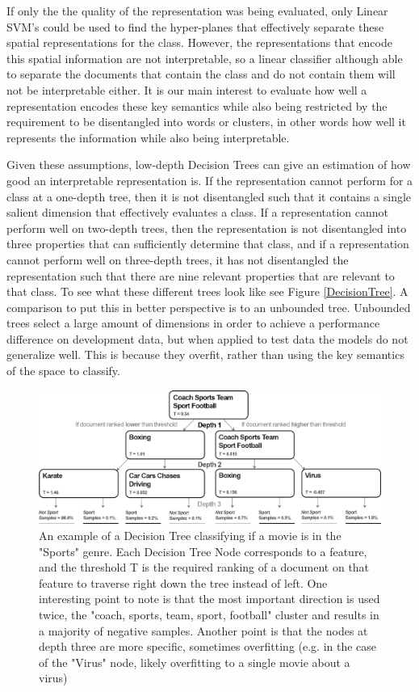 If only the the quality of the representation was being evaluated, only Linear SVM's could be used to find the hyper-planes that effectively separate these spatial representations for the class. However, the representations that encode this spatial information are not interpretable, so a linear classifier although able to separate the documents that contain the class and do not contain them will not be interpretable either. It is our main interest to evaluate how well a representation encodes these key semantics while also being restricted by the requirement to be disentangled into words or clusters, in other words how well it represents the information while also being interpretable.

Given these assumptions, low-depth Decision Trees can give an estimation of how good an interpretable representation is. If the representation cannot perform for a class at a one-depth tree, then it is not disentangled such that it contains a single salient dimension that effectively evaluates a class. If a representation cannot perform well on two-depth trees, then the representation is not disentangled into three properties that can sufficiently determine that class, and if a representation cannot perform well on three-depth trees, it has not disentangled the representation such that there are nine relevant properties that are relevant to that class. To see what these different trees look like see Figure \ref{DecisionTree}. A comparison to put this in better perspective is to an unbounded tree. Unbounded trees select a large amount of dimensions in order to achieve a performance difference on development data, but when applied to test data the models do not generalize well. This is because they overfit, rather than using the key semantics of the space to classify.

\begin{figure}[t]
	\includegraphics[width=450px]{images/decision_tree_ex.png}
	\centering
	\caption{An example of a Decision Tree classifying if a movie is in the "Sports" genre. Each Decision Tree Node corresponds to a feature, and the threshold T is the required ranking of a document on that feature to traverse right down the tree instead of left. One interesting point to note is that the most important direction is used twice, the "coach, sports, team, sport, football" cluster and results in a majority of negative samples. Another point is that the nodes at depth three are more specific, sometimes overfitting (e.g. in the case of the "Virus" node, likely overfitting to a single movie about a virus) }\label{ch3:DecisionTree}
\end{figure}



